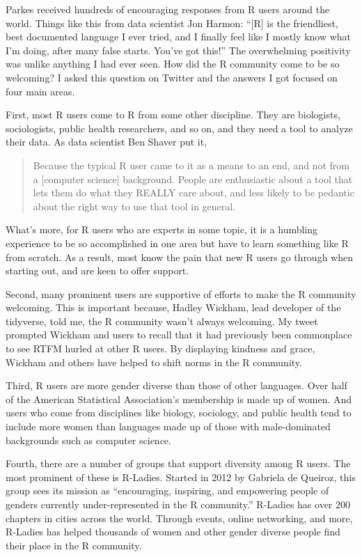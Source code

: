 \documentclass[
]{book}
\begin{document}
Parkes received hundreds of encouraging responses from R users around the world. Things like this from data scientist Jon Harmon: ``{[}R{]} is the friendliest, best documented language I ever tried, and I finally feel like I mostly know what I'm doing, after many false starts. You've got this!'' The overwhelming positivity was unlike anything I had ever seen. How did the R community come to be so welcoming? I asked this question on Twitter and the answers I got focused on four main areas.

First, most R users come to R from some other discipline. They are biologists, sociologists, public health researchers, and so on, and they need a tool to analyze their data. As data scientist Ben Shaver put it,

\begin{quote}
Because the typical R user came to it as a means to an end, and not from a {[}computer science{]} background. People are enthusiastic about a tool that lets them do what they REALLY care about, and less likely to be pedantic about the right way to use that tool in general.
\end{quote}

What's more, for R users who are experts in some topic, it is a humbling experience to be so accomplished in one area but have to learn something like R from scratch. As a result, most know the pain that new R users go through when starting out, and are keen to offer support.

Second, many prominent users are supportive of efforts to make the R community welcoming. This is important because, Hadley Wickham, lead developer of the tidyverse, told me, the R community wasn't always welcoming. My tweet prompted Wickham and users to recall that it had previously been commonplace to see RTFM hurled at other R users. By displaying kindness and grace, Wickham and others have helped to shift norms in the R community.

Third, R users are more gender diverse than those of other languages. Over half of the American Statistical Association's membership is made up of women. And users who come from disciplines like biology, sociology, and public health tend to include more women than languages made up of those with male-dominated backgrounds such as computer science.

Fourth, there are a number of groups that support diversity among R users. The most prominent of these is R-Ladies. Started in 2012 by Gabriela de Queiroz, this group sees its mission as ``encouraging, inspiring, and empowering people of genders currently under-represented in the R community.'' R-Ladies has over 200 chapters in cities across the world. Through events, online networking, and more, R-Ladies has helped thousands of women and other gender diverse people find their place in the R community.
\end{document}
